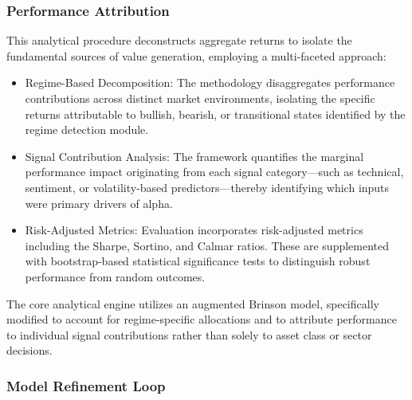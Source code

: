 \documentclass{singlecol-new}
\theoremstyle{TH}{
\newtheorem{lemma}{Lemma}
\newtheorem{theorem}[lemma]{Theorem}
\newtheorem{corrolary}[lemma]{Corrolary}
\newtheorem{conjecture}[lemma]{Conjecture}
\newtheorem{proposition}[lemma]{Proposition}
\newtheorem{claim}[lemma]{Claim}
\newtheorem{stheorem}[lemma]{Wrong Theorem}
\newtheorem{algorithm}{Algorithm}
}
\theoremstyle{THrm}{
\newtheorem{definition}{Definition}[section]
\newtheorem{question}{Question}[section]
\newtheorem{remark}{Remark}
\newtheorem{scheme}{Scheme}
}
\theoremstyle{THhit}{
\newtheorem{case}{Case}[section]
}
\begin{document}
\subsubsection{Performance Attribution}

This analytical procedure deconstructs aggregate returns to isolate the fundamental sources of value generation, employing a multi-faceted approach:
\begin{itemize}
    \item Regime-Based Decomposition: The methodology disaggregates performance contributions across distinct market environments, isolating the specific returns attributable to bullish, bearish, or transitional states identified by the regime detection module.
    \item Signal Contribution Analysis: The framework quantifies the marginal performance impact originating from each signal category—such as technical, sentiment, or volatility-based predictors—thereby identifying which inputs were primary drivers of alpha.
    \item Risk-Adjusted Metrics: Evaluation incorporates risk-adjusted metrics including the Sharpe, Sortino, and Calmar ratios. These are supplemented with bootstrap-based statistical significance tests to distinguish robust performance from random outcomes.
\end{itemize}
The core analytical engine utilizes an augmented Brinson model, specifically modified to account for regime-specific allocations and to attribute performance to individual signal contributions rather than solely to asset class or sector decisions.


\subsubsection{Model Refinement Loop}
\end{document}
